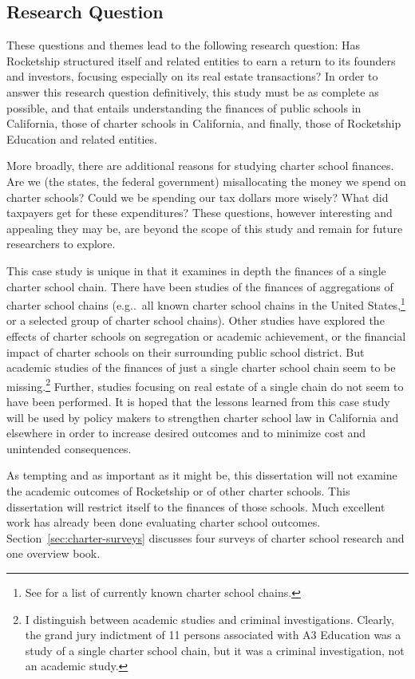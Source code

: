 \subsection{Research Question}\label{sec:research-questions}\indent
These questions and themes lead to the following research question: Has Rocketship structured itself and related entities to earn a return to its founders and investors, focusing especially on its real estate transactions? In order to answer this research question definitively, this study must be as complete as possible, and that entails understanding the finances of public schools in California, those of charter schools in California, and finally, those of Rocketship Education and related entities. 

More broadly, there are additional reasons for studying charter school finances. Are we (the states, the federal government) misallocating the money we spend on charter schools? Could we be spending our tax dollars more wisely? What did taxpayers get for these expenditures? These questions, however interesting and appealing they may be, are beyond the scope of this study and remain for future researchers to explore.

This case study is unique in that it examines in depth the finances of a single charter school chain. There have been studies of the finances of aggregations of charter school chains (e.g..~all known charter school chains in the United States,\footnote{See \textcite{Miron.etal2021} for a list of currently known charter school chains.} or a selected group of charter school chains). Other studies have explored the effects of charter schools on segregation or academic achievement, or the financial impact of charter schools on their surrounding public school district. But academic studies of the finances of just a single charter school chain seem to be missing.\footnote{I distinguish between academic studies and criminal investigations. Clearly, the grand jury indictment of 11 persons associated with A3 Education was a study of a single charter school chain, but it was a criminal investigation, not an academic study.} Further, studies focusing on real estate of a single chain do not seem to have been performed. It is hoped that the lessons learned from this case study will be used by policy makers to strengthen charter school law in California and elsewhere in order to increase desired outcomes and to minimize cost and unintended consequences.

As tempting and as important as it might be, this dissertation will not examine the academic outcomes of Rocketship or of other charter schools. This dissertation will restrict itself to the finances of those schools. Much excellent work has already been done evaluating charter school outcomes. Section~\ref{sec:charter-surveys} discusses four surveys of charter school research and one overview book.

